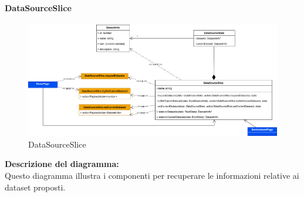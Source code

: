 \paragraph{DataSourceSlice}
\begin{figure}[h!] \centering
      \includegraphics[scale=0.18]{template/images/uml_front/logic/DataSourceSlice.png}
      \caption{DataSourceSlice}
\end{figure}
\textbf{Descrizione del diagramma:}\\
Questo diagramma illustra i componenti per recuperare le informazioni relative ai dataset proposti.

